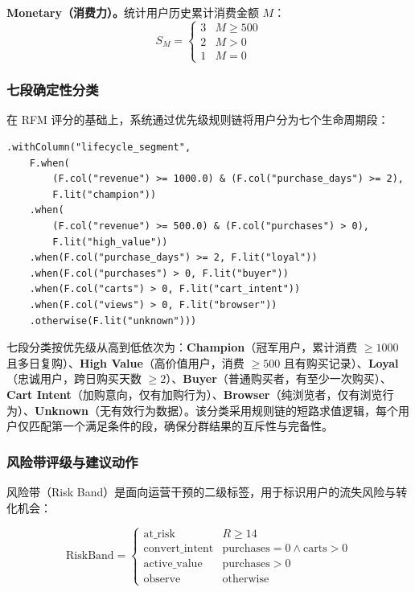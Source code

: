 \textbf{Monetary（消费力）。}统计用户历史累计消费金额 $M$：
\begin{equation}
    S_M = \begin{cases} 3 & M \geq 500 \\ 2 & M > 0 \\ 1 & M = 0 \end{cases}
    \label{eq:monetary-score}
\end{equation}

\subsubsection{七段确定性分类}

在 RFM 评分的基础上，系统通过优先级规则链将用户分为七个生命周期段：

\begin{lstlisting}[style=codexcode]
.withColumn("lifecycle_segment",
    F.when(
        (F.col("revenue") >= 1000.0) & (F.col("purchase_days") >= 2),
        F.lit("champion"))
    .when(
        (F.col("revenue") >= 500.0) & (F.col("purchases") > 0),
        F.lit("high_value"))
    .when(F.col("purchase_days") >= 2, F.lit("loyal"))
    .when(F.col("purchases") > 0, F.lit("buyer"))
    .when(F.col("carts") > 0, F.lit("cart_intent"))
    .when(F.col("views") > 0, F.lit("browser"))
    .otherwise(F.lit("unknown")))
\end{lstlisting}

七段分类按优先级从高到低依次为：\textbf{Champion}（冠军用户，累计消费 $\geq 1000$ 且多日复购）、\textbf{High Value}（高价值用户，消费 $\geq 500$ 且有购买记录）、\textbf{Loyal}（忠诚用户，跨日购买天数 $\geq 2$）、\textbf{Buyer}（普通购买者，有至少一次购买）、\textbf{Cart Intent}（加购意向，仅有加购行为）、\textbf{Browser}（纯浏览者，仅有浏览行为）、\textbf{Unknown}（无有效行为数据）。该分类采用规则链的短路求值逻辑，每个用户仅匹配第一个满足条件的段，确保分群结果的互斥性与完备性。

\subsubsection{风险带评级与建议动作}

风险带（Risk Band）是面向运营干预的二级标签，用于标识用户的流失风险与转化机会：

\begin{equation}
    \text{RiskBand} = \begin{cases}
        \text{at\_risk}        & R \geq 14                                    \\
        \text{convert\_intent} & \text{purchases} = 0 \wedge \text{carts} > 0 \\
        \text{active\_value}   & \text{purchases} > 0                         \\
        \text{observe}         & \text{otherwise}
    \end{cases}
    \label{eq:risk-band}
\end{equation}

